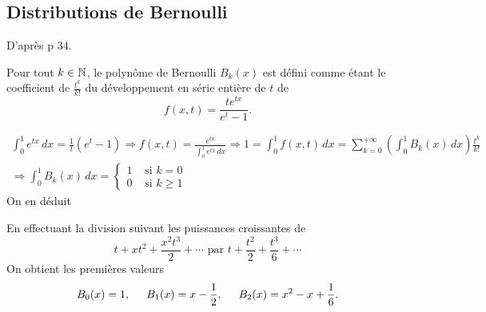 \subsection{Distributions de Bernoulli}
D'après \cite{koblitz2012p} p 34.
\begin{defi}\label{Def:PolBernoulli}
 Pour tout $k\in \mathbb{N}$, le polynôme de Bernoulli $B_k(x)$ est défini comme étant le coefficient de $\frac{t^k}{k!}$ du développement en série entière de $t$ de
 \begin{displaymath}
  f(x,t) = \frac{t e^{tx}}{e^t - 1}.
 \end{displaymath}
\end{defi}

\begin{rem}
 \begin{multline*}
  \int_0^1 e^{tx}\, dx = \frac{1}{t} (e^t - 1) \Rightarrow f(x,t) = \frac{e^{tx}}{\int_0^1 e^{tx}\, dx}
  \Rightarrow 1 = \int_0^1 f(x,t)\,dx = \sum_{k=0}^{+\infty}\left(\int_0^1 B_k(x)\,dx\right)  \frac{t^k}{k!} \\
  \Rightarrow
    \int_0^1 B_k(x)\,dx =
    \left\lbrace
      \begin{aligned}
        1 &\text{ si } k = 0\\
        0 &\text{ si } k \geq 1
      \end{aligned}
    \right.
 \end{multline*}
On en déduit
\end{rem}
\noindent En effectuant la division suivant les puissances croissantes de
\begin{displaymath}
 t + xt^2 + \frac{x^2t^3}{2} + \cdots \text{ par } t + \frac{t^2}{2} + \frac{t^3}{6} + \cdots
\end{displaymath}
On obtient les premières valeurs
\begin{displaymath}
 B_0(x) = 1 ,\hspace{0.5cm} B_1(x) = x - \frac{1}{2} ,\hspace{0.5cm} B_2(x) = x^2 - x + \frac{1}{6}.
\end{displaymath}

